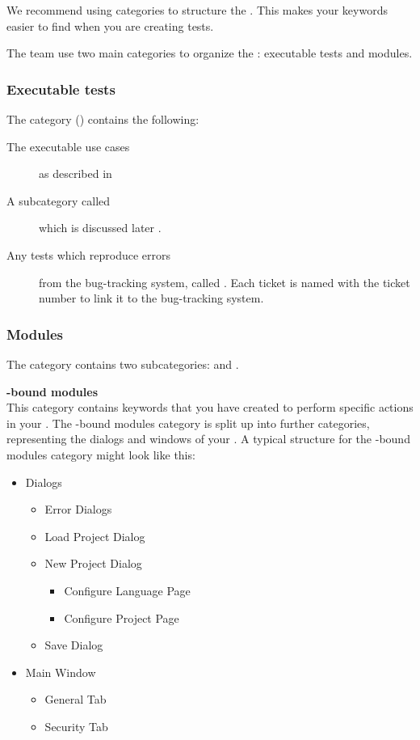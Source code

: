 We recommend using categories  to structure the \gdtestcasebrowser{}. This makes your keywords easier to find when you are creating tests. 

The \jb{} team use two main categories to organize the \gdtestcasebrowser{}: executable tests and modules. 

\subsubsection{Executable tests}
The  category () contains the following:
\begin{description}
\item [The executable use cases]{as described in }
\item [A subcategory called \bxname{\gdehandlers{}}]{which is discussed later }.
\item [Any tests which reproduce errors]{ from the bug-tracking system, called . Each ticket \gdcase{} is named with the ticket number to link it to the bug-tracking system. }
\end{description}

\subsubsection{Modules}
The  category contains two subcategories:  and . 

\textbf{\gdaut{}-bound modules}\\
This category contains keywords that you have created to perform specific actions in your \gdaut{}. The \gdaut{}-bound modules category is split up into further categories, representing the dialogs and windows of your \gdaut{}. A typical structure for the \gdaut{}-bound modules category might look like this:
\begin{itemize}
\item Dialogs
\begin{itemize}
\item Error Dialogs
\item Load Project Dialog
\item New Project Dialog
\begin{itemize}
\item Configure Language Page
\item Configure Project Page
\end{itemize}
\item Save Dialog
\end{itemize}
\item Main Window
\begin{itemize}
\item General Tab
\item Security Tab
\end{itemize}
\end{itemize}

